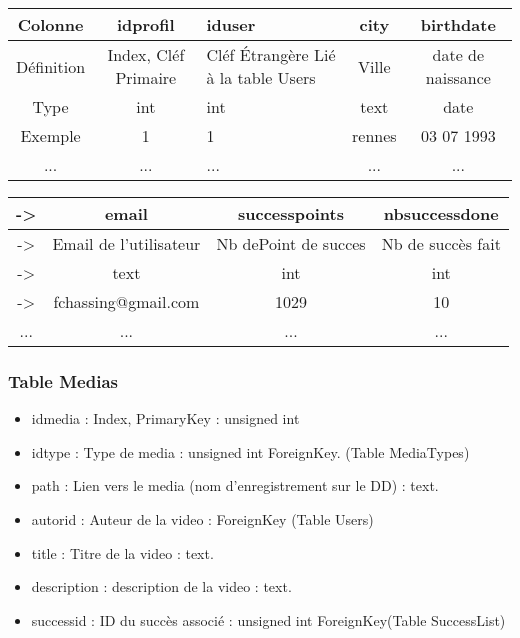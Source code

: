 \documentclass[a4paper,10pt]{article}
\begin{document}
\begin{center}
\begin{tabular}{| c | c | p{3cm} | c | c |}
\hline
Colonne & idprofil &iduser & city & birthdate \\ \hline
Définition & Index, Cléf Primaire & Cléf \'Etrangère Lié à la table Users & Ville & date de naissance\\ \hline
Type & int & int & text & date\\ \hline
Exemple & 1 & 1 & rennes & 03 07 1993  \\ \hline
... & ... & ... & ... & ... \\
\end{tabular}
\end{center}


\begin{center}
\begin{tabular}{| c | c | c | c | }
\hline
-> & email & successpoints & nbsuccessdone\\ \hline
-> & Email de l'utilisateur & Nb dePoint de succes & Nb de succès fait\\ \hline
-> & text & int & int\\ \hline
-> & fchassing@gmail.com & 1029 & 10\\ \hline
... & ... & ... & ... \\
\end{tabular}
\end{center}

\subsubsection{Table Medias}

\begin{itemize}
\item idmedia : Index, PrimaryKey : unsigned int
\item idtype : Type de media : unsigned int ForeignKey. (Table MediaTypes)
\item path : Lien vers le media (nom d'enregistrement sur le DD) : text.
\item autorid : Auteur de la video : ForeignKey (Table Users)
\item title : Titre de la video : text.
\item description : description de la video : text.
\item successid : ID du succès associé : unsigned int ForeignKey(Table SuccessList)
\end{itemize}
\end{document}
